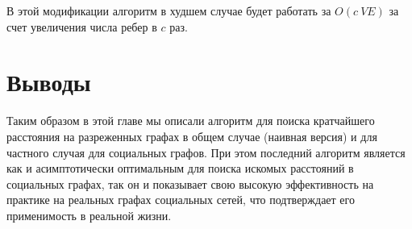 В этой модификации алгоритм в худшем случае будет работать за $O(c \ VE)$ за счет увеличения числа ребер в $c$ раз.

\FloatBarrier
\section{Выводы}
Таким образом в этой главе мы описали алгоритм для поиска кратчайшего расстояния на разреженных графах в общем случае (наивная версия) и для частного случая для социальных графов. При этом последний алгоритм является как и асимптотически оптимальным для поиска искомых расстояний в социальных графах, так он и показывает свою высокую эффективность на практике на реальных графах социальных сетей, что подтверждает его применимость в реальной жизни.
\FloatBarrier
